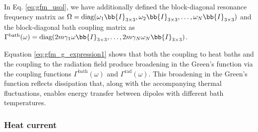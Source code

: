 In Eq. \eqref{eq:gfm_usol}, we have additionally defined the block-diagonal resonance frequency matrix as $\Omega=\textrm{diag}(\omega_1\bb{I}_{3\times 3},\omega_2\bb{I}_{3\times 3},\dots,\omega_N\bb{I}_{3\times 3})$ and the block-diagonal bath coupling matrix as $\Gamma^{\textrm{bath}} (\omega) = \textrm{diag}(2m \gamma_1 \omega\bb{I}_{3\times 3},\dots,2m\gamma_N \omega_N \bb{I}_{3\times 3})$.


Equation \eqref{eq:gfm_g_expression1} shows that both the coupling to heat baths and the coupling to the radiation field produce broadening in the Green's function via the coupling functions $\Gamma^{\textrm{bath}}(\omega)$ and $\Gamma^{\textrm{rad}}(\omega)$. This broadening in the Green's function reflects dissipation that, along with the accompanying thermal fluctuations, enables energy transfer between dipoles with different bath temperatures.

\subsubsection{Heat current}

